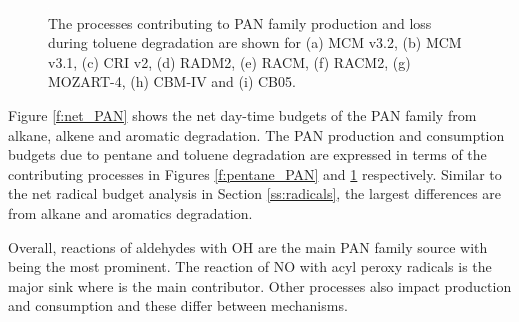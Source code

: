 \begin{figure}
    \begin{center}
        \includegraphics[width=\textwidth]{img/toluene_pan_budgets}
    \end{center}
    \caption{The processes contributing to PAN family production and loss during toluene degradation are shown for (a) MCM v3.2, (b) MCM v3.1, (c) CRI v2, (d) RADM2, (e) RACM, (f) RACM2, (g) MOZART-4, (h) CBM-IV and (i) CB05.}
    \label{f:toluene_PAN}
\end{figure}

Figure \ref{f:net_PAN} shows the net day-time budgets of the PAN family from alkane, alkene and aromatic degradation. 
The PAN production and consumption budgets due to pentane and toluene degradation are expressed in terms of the contributing processes in Figures \ref{f:pentane_PAN} and \ref{f:toluene_PAN} respectively. 
Similar to the net radical budget analysis in Section \ref{ss:radicals}, the largest differences are from alkane and aromatics degradation.

Overall, reactions of aldehydes with OH are the main PAN family source with  being the most prominent. 
The reaction of NO with acyl peroxy radicals is the major sink where  is the main contributor. 
Other processes also impact production and consumption and these differ between mechanisms.
\begin{reactionlist}
\end{reactionlist}

